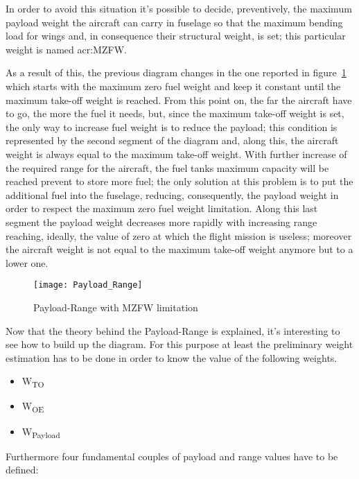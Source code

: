 In order to avoid this situation it’s possible to decide, preventively, the maximum payload weight the aircraft can carry in fuselage so that the maximum bending load for wings and, in consequence their structural weight, is set; this particular weight is named \gls{acr:MZFW}.

\bigskip
\noindent
As a result of this, the previous diagram changes in the one reported in figure~\ref{fig:Figure2} which starts with the maximum zero fuel weight and keep it constant until the maximum take-off weight is reached. From this point on, the far the aircraft have to go, the more the fuel it needs, but, since the maximum take-off weight is set, the only way to increase fuel weight is to reduce the payload; this condition is represented by the second segment of the diagram and, along this, the aircraft weight is always equal to the maximum take-off weight. With further increase of the required range for the aircraft, the fuel tanks maximum capacity will be reached prevent to store more fuel; the only solution at this problem is to put the additional fuel into the fuselage, reducing, consequently, the payload weight in order to respect the maximum zero fuel weight limitation. Along this last segment the payload weight decreases more rapidly with increasing range reaching, ideally, the value of zero at which the flight mission is useless; moreover the aircraft weight is not equal to the maximum take-off weight anymore but to a lower one.

\bigskip
\begin{figure}[ht]
\centering
\texttt{[image: Payload\_Range]}
\caption{Payload-Range with MZFW limitation}
\label{fig:Figure2}
\end{figure}

\bigskip
\noindent
Now that the theory behind the Payload-Range is explained, it’s interesting to see how to build up the diagram. For this purpose at least the preliminary weight estimation has to be done in order to know the value of the following weights.

\begin{itemize}
\item W\textsubscript{TO}
\item W\textsubscript{OE}
\item W\textsubscript{Payload}
\end{itemize}

\noindent 
Furthermore four fundamental couples of payload and range values have to be defined:

